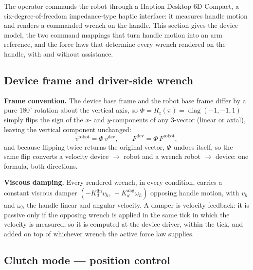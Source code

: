 \documentclass[12pt,a4paper,twoside,openright]{report}
\begin{document}
The operator commands the robot through a Haption Desktop 6D Compact, a six-degree-of-freedom impedance-type haptic interface: it measures handle motion and renders a commanded wrench on the handle. This section gives the device model, the two command mappings that turn handle motion into an arm reference, and the force laws that determine every wrench rendered on the handle, with and without assistance.

\subsection{Device frame and driver-side wrench}
\label{sec:device}

\textbf{Frame convention.} The device base frame and the robot base frame differ by a pure $180^{\circ}$ rotation about the vertical axis, so $\Phi = R_z(\pi) = \operatorname{diag}(-1,-1,1)$ simply flips the sign of the $x$- and $y$-components of any 3-vector (linear or axial), leaving the vertical component unchanged:
\begin{equation}
v^{\text{robot}} = \Phi\, v^{\text{dev}},
\qquad
F^{\text{dev}} = \Phi\, F^{\text{robot}},
\label{eq:flip}
\end{equation}
and because flipping twice returns the original vector, $\Phi$ undoes itself, so the same flip converts a velocity device $\to$ robot and a wrench robot $\to$ device: one formula, both directions.

\textbf{Viscous damping.} Every rendered wrench, in every condition, carries a constant viscous damper $(-K_d^{\text{lin}} v_h,\, -K_d^{\text{ang}} \omega_h)$ opposing handle motion, with $v_h$ and $\omega_h$ the handle linear and angular velocity. A damper is velocity feedback: it is passive only if the opposing wrench is applied in the same tick in which the velocity is measured, so it is computed at the device driver, within the tick, and added on top of whichever wrench the active force law supplies.

\subsection{Clutch mode --- position control}
\label{sec:clutchmode}
\end{document}
